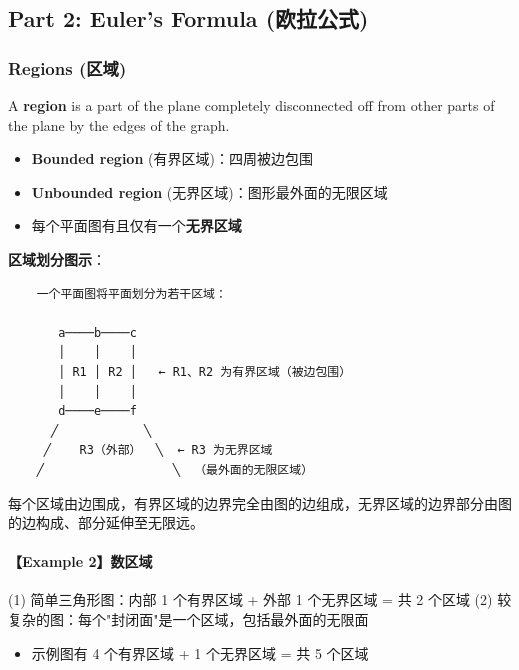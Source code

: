 \documentclass[10pt,a4paper,openany]{ctexbook}
\theoremstyle{definition}
\theoremstyle{remark}
\renewenvironment{quote}
  {\list{}{\leftmargin=1em\rightmargin=0pt\topsep=0.5pt\partopsep=0pt}\item[]}
  {\endlist}
\begin{document}
\subsection{Part 2: Euler's Formula (欧拉公式)}

\subsubsection{Regions (区域)}

A \textbf{region} is a part of the plane completely disconnected off from other parts of the plane by the edges of the graph.
\begin{itemize}
\item \textbf{Bounded region} (有界区域)：四周被边包围
\item \textbf{Unbounded region} (无界区域)：图形最外面的无限区域
\item 每个平面图有且仅有一个\textbf{无界区域}

\end{itemize}

\textbf{区域划分图示}：
{\footnotesize\begin{verbatim}
    一个平面图将平面划分为若干区域：

       a────b────c
       │    │    │
       │ R1 │ R2 │   ← R1、R2 为有界区域（被边包围）
       │    │    │
       d────e────f
      ╱            ╲
     ╱    R3（外部）  ╲  ← R3 为无界区域
    ╱                  ╲  （最外面的无限区域）
\end{verbatim}}

\begin{quote}
每个区域由边围成，有界区域的边界完全由图的边组成，无界区域的边界部分由图的边构成、部分延伸至无限远。

\end{quote}

\paragraph{【Example 2】数区域}

(1) 简单三角形图：内部 1 个有界区域 + 外部 1 个无界区域 = 共 2 个区域
(2) 较复杂的图：每个"封闭面"是一个区域，包括最外面的无限面
\begin{itemize}
\item 示例图有 4 个有界区域 + 1 个无界区域 = 共 5 个区域

\end{itemize}

\vspace{-2pt}
\end{document}
